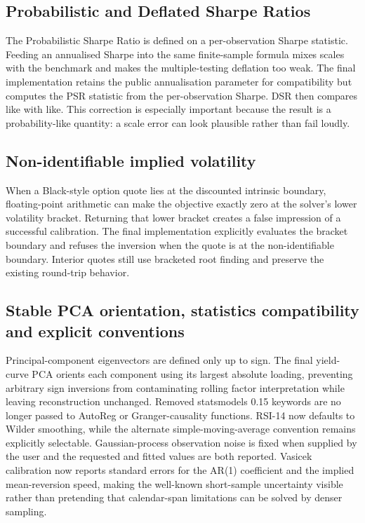 \documentclass{asrpaper}
\begin{document}
\subsection{Probabilistic and Deflated Sharpe Ratios}
The Probabilistic Sharpe Ratio is defined on a per-observation Sharpe statistic. Feeding an annualised Sharpe into the same finite-sample formula mixes scales with the benchmark and makes the multiple-testing deflation too weak. The final implementation retains the public annualisation parameter for compatibility but computes the PSR statistic from the per-observation Sharpe. DSR then compares like with like. This correction is especially important because the result is a probability-like quantity: a scale error can look plausible rather than fail loudly.

\subsection{Non-identifiable implied volatility}
When a Black-style option quote lies at the discounted intrinsic boundary, floating-point arithmetic can make the objective exactly zero at the solver's lower volatility bracket. Returning that lower bracket creates a false impression of a successful calibration. The final implementation explicitly evaluates the bracket boundary and refuses the inversion when the quote is at the non-identifiable boundary. Interior quotes still use bracketed root finding and preserve the existing round-trip behavior.

\subsection{Stable PCA orientation, statistics compatibility and explicit conventions}
Principal-component eigenvectors are defined only up to sign. The final yield-curve PCA orients each component using its largest absolute loading, preventing arbitrary sign inversions from contaminating rolling factor interpretation while leaving reconstruction unchanged. Removed statsmodels 0.15 keywords are no longer passed to AutoReg or Granger-causality functions. RSI-14 now defaults to Wilder smoothing, while the alternate simple-moving-average convention remains explicitly selectable. Gaussian-process observation noise is fixed when supplied by the user and the requested and fitted values are both reported. Vasicek calibration now reports standard errors for the AR(1) coefficient and the implied mean-reversion speed, making the well-known short-sample uncertainty visible rather than pretending that calendar-span limitations can be solved by denser sampling.
\end{document}
